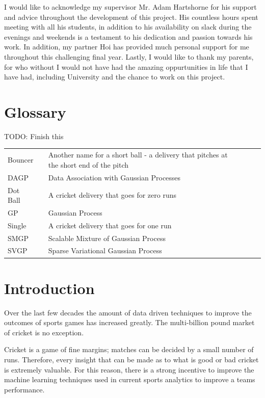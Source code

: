 \documentclass[12pt,a4paper]{report}
\theoremstyle{definition}
\begin{document}
I would like to acknowledge my supervisor Mr. Adam Hartshorne for his support and advice throughout the development of this project.  
His countless hours spent meeting with all his students, in addition to his availability on slack during the evenings and weekends is a testament to his dedication and passion towards his work.
In addition, my partner Hoi has provided much personal support for me throughout this challenging final year.
Lastly, I would like to thank my parents, for who without I would not have had the amazing oppurtunities in life that I have had, including University and the chance to work on this project.

\newpage

\chapter*{Glossary}

TODO: Finish this

\begin{tabular}{l@{}cll@{}cl}
	Bouncer && Another name for a short ball - a delivery that pitches at the short end of the pitch \\
	DAGP && Data Association with Gaussian Processes \\
	Dot Ball && A cricket delivery that goes for zero runs \\
	GP && Gaussian Process \\
	Single && A cricket delivery that goes for one run \\
	SMGP && Scalable Mixture of Gaussian Process \\
	SVGP && Sparse Variational Gaussian Process \\
\end{tabular}

\newpage
\setcounter{page}{1}

\chapter{Introduction}

Over the last few decades the amount of data driven techniques to improve the outcomes of sports games has increased greatly. 
The multi-billion pound market of cricket is no exception. 

Cricket is a game of fine margins; matches can be decided by a small number of runs.
Therefore, every insight that can be made as to what is good or bad cricket is extremely valuable.
For this reason, there is a strong incentive to improve the machine learning techniques used in current sports analytics to improve a teams performance.
\end{document}
